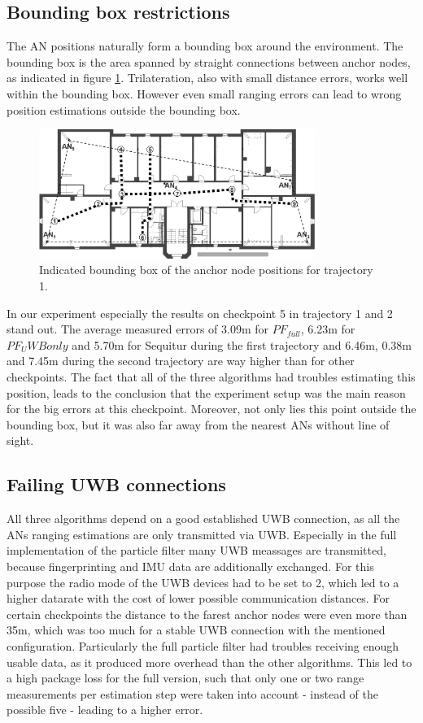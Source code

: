 \subsection{Bounding box restrictions}
The AN positions naturally form a bounding box around the environment. The bounding box is the area spanned by straight connections between anchor nodes, as indicated in figure \ref{fig:trajectory1_boundingBox}. Trilateration, also with small distance errors, works well within the bounding box. However even small ranging errors can lead to wrong position estimations outside the bounding box. 
\begin{figure}[th]
\centering
\includegraphics[width=0.8\textwidth]{Figures/trajectory1_boundingBox}
\decoRule
\caption[Bounding box and checkpoints for trajectory 1 ]{Indicated bounding box of the anchor node positions for trajectory 1.}
\label{fig:trajectory1_boundingBox}
\end{figure}
In our experiment especially the results on checkpoint 5 in trajectory 1 and 2 stand out. The average measured errors of 3.09m for $PF_{full}$, 6.23m for ${PF_UWBonly}$ and 5.70m for Sequitur during the first trajectory and 6.46m,  0.38m and 7.45m during the second trajectory are way higher than for other checkpoints. The fact that all of the three algorithms had troubles estimating this position, leads to the conclusion that the experiment setup was the main reason for the big errors at this checkpoint. Moreover, not only lies this point outside the bounding box, but it was also far away from the nearest ANs without line of sight.

\subsection{Failing UWB connections}
All three algorithms depend on a good established UWB connection, as all the ANs ranging estimations are only transmitted via UWB. Especially in the full implementation of the particle filter many UWB meassages are transmitted, because fingerprinting and IMU data are additionally exchanged. For this purpose the radio mode of the UWB devices had to be set to 2, which led to a higher datarate with the cost of lower possible communication distances.
For certain checkpoints the distance to the farest anchor nodes were even more than 35m, which was too much for a stable UWB connection with the mentioned configuration. Particularly the full particle filter had troubles receiving enough usable data, as it produced more overhead than the other algorithms. This led to a high package loss for the full version, such that only one or two range measurements per estimation step were taken into account - instead of the possible five - leading to a higher error. 


